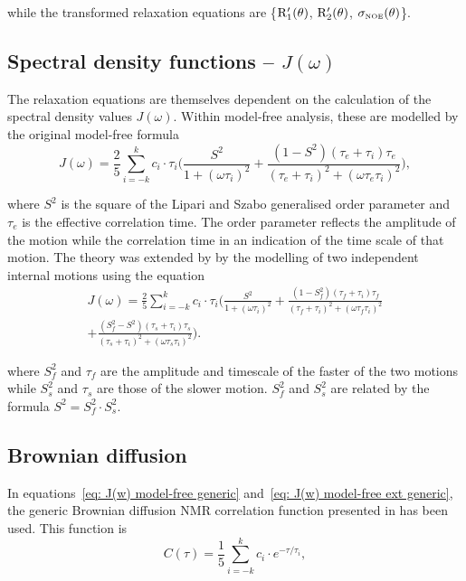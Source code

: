 \noindent while the transformed relaxation equations are \{$\mathrm{R}_1'(\theta)$, $\mathrm{R}_2'(\theta)$, $\sigma_{\scriptscriptstyle \mathrm{NOE}}(\theta)$\}.


\subsection{Spectral density functions -- $J(\omega)$}

The relaxation equations are themselves dependent on the calculation of the spectral density values $J(\omega)$.  Within model-free analysis, these are modelled by the original model-free formula \citep{LipariSzabo82a, LipariSzabo82b}
\begin{equation} \label{eq: J(w) model-free generic}
 J(\omega) = \frac{2}{5} \sum_{i=-k}^k c_i \cdot \tau_i \Bigg(
  \frac{S^2}{1 + (\omega \tau_i)^2}
  + \frac{(1 - S^2)(\tau_e + \tau_i)\tau_e}{(\tau_e + \tau_i)^2 + (\omega \tau_e \tau_i)^2}
 \Bigg),
\end{equation}

\noindent where $S^2$ is the square of the Lipari and Szabo generalised order parameter and $\tau_e$ is the effective correlation time.  The order parameter reflects the amplitude of the motion while the correlation time in an indication of the time scale of that motion.  The theory was extended by \citet{Clore90} by the modelling of two independent internal motions using the equation
\begin{multline} \label{eq: J(w) model-free ext generic}
 J(\omega) = \frac{2}{5} \sum_{i=-k}^k c_i \cdot \tau_i \Bigg(
  \frac{S^2}{1 + (\omega \tau_i)^2}
  + \frac{(1 - S^2_f)(\tau_f + \tau_i)\tau_f}{(\tau_f + \tau_i)^2 + (\omega \tau_f \tau_i)^2}       \\
  + \frac{(S^2_f - S^2)(\tau_s + \tau_i)\tau_s}{(\tau_s + \tau_i)^2 + (\omega \tau_s \tau_i)^2}
 \Bigg).
\end{multline}

\noindent where $S^2_f$ and $\tau_f$ are the amplitude and timescale of the faster of the two motions while $S^2_s$ and $\tau_s$ are those of the slower motion.  $S^2_f$ and $S^2_s$ are related by the formula $S^2 = S^2_f \cdot S^2_s$.



\subsection{Brownian diffusion}

In equations~\eqref{eq: J(w) model-free generic} and~\eqref{eq: J(w) model-free ext generic}, the generic Brownian diffusion NMR correlation function presented in \citet{dAuvergneGooley06b} has been used.  This function is
\begin{equation} \label{eq: C(tau) generic}
 C(\tau) = \frac{1}{5} \sum_{i=-k}^k c_i \cdot e^{-\tau/\tau_i},
\end{equation}

